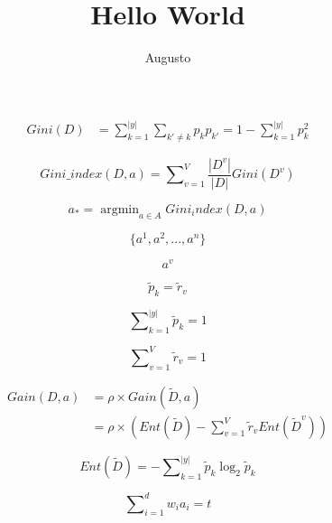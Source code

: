 \documentclass{article}
\title{Hello World}
\author {Augusto}
\begin{document}
\begin{equation}\label{gini}
\begin{split}
  Gini(D) & = \sum\nolimits_{k=1}^{\left|y\right|}\sum_{k'\neq k}^{}p_kp_{k'} =1 - \sum\nolimits_{k=1}^{\left|y\right|}p_k^2
\end{split}
\end{equation}

\begin{equation}\label{ginia}
  Gini\_index(D,a) = \sum\nolimits_{v=1}^{V}\frac{\left|D^v\right|}{\left|D\right|}Gini(D^v)
\end{equation}

\begin{equation}\label{argmin}
  a_* = \mathop{\arg\min}_{a \in A} Gini_index(D,a)
\end{equation}

\begin{equation}\label{sort}
  \{a^1,a^2,...,a^n\}
\end{equation}

\begin{equation}\label{at}
  a^v
\end{equation}

\begin{equation}\label{tilde}
  \tilde{p}_k = \tilde{r}_v
\end{equation}

\begin{equation}\label{s}
  \sum\nolimits_{k = 1}^{\left|y\right|}\tilde{p}_k = 1
\end{equation}

\begin{equation}\label{ss}
  \sum\nolimits_{v=1}^{V}\tilde{r}_v = 1
\end{equation}

\begin{equation}\label{gain_ex}
\begin{split}
  Gain(D,a) & = \rho \times Gain(\tilde{D},a) \\
   & = \rho \times \left( Ent(\tilde{D}) - \sum\nolimits_{v=1}^{V}\tilde{r}_vEnt(\tilde{D}^v)\right)
\end{split}
\end{equation}

\begin{equation}\label{ent}
  Ent(\tilde{D}) = - \sum\nolimits_{k=1}^{\left|y\right|}\tilde{p}_k\log_2\tilde{p}_k
\end{equation}

\begin{equation}\label{multi}
  \sum\nolimits_{i=1}^{d}w_ia_i=t
\end{equation}
\end{document}
